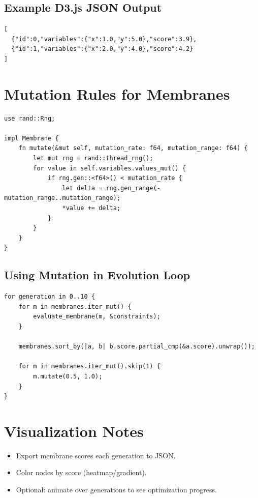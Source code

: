 \documentclass[12pt]{article}
\begin{document}
\subsection{Example D3.js JSON Output}

\begin{lstlisting}[style=ruststyle]
[
  {"id":0,"variables":{"x":1.0,"y":5.0},"score":3.9},
  {"id":1,"variables":{"x":2.0,"y":4.0},"score":4.2}
]
\end{lstlisting}

\section{Mutation Rules for Membranes}

\begin{lstlisting}[style=ruststyle]
use rand::Rng;

impl Membrane {
    fn mutate(&mut self, mutation_rate: f64, mutation_range: f64) {
        let mut rng = rand::thread_rng();
        for value in self.variables.values_mut() {
            if rng.gen::<f64>() < mutation_rate {
                let delta = rng.gen_range(-mutation_range..mutation_range);
                *value += delta;
            }
        }
    }
}
\end{lstlisting}

\subsection{Using Mutation in Evolution Loop}

\begin{lstlisting}[style=ruststyle]
for generation in 0..10 {
    for m in membranes.iter_mut() {
        evaluate_membrane(m, &constraints);
    }

    membranes.sort_by(|a, b| b.score.partial_cmp(&a.score).unwrap());

    for m in membranes.iter_mut().skip(1) {
        m.mutate(0.5, 1.0);
    }
}
\end{lstlisting}

\section{Visualization Notes}

\begin{itemize}
    \item Export membrane scores each generation to JSON.
    \item Color nodes by score (heatmap/gradient).
    \item Optional: animate over generations to see optimization progress.
\end{itemize}
\end{document}
